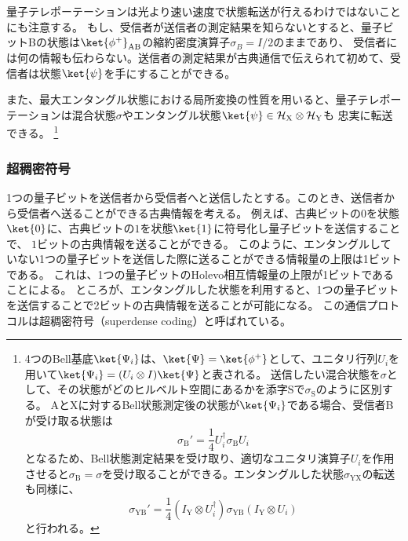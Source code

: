 \documentclass[a4paper,11pt,uplatex]{jsarticle}%
\begin{document}
量子テレポーテーションは光より速い速度で状態転送が行えるわけではないことにも注意する。
もし、受信者が送信者の測定結果を知らないとすると、量子ビットBの状態は$\ket{\phi^{+}}_{\text{AB}}$の縮約密度演算子$\sigma_{B} = I/2$のままであり、
受信者には何の情報も伝わらない。送信者の測定結果が古典通信で伝えられて初めて、受信者は状態$\ket{\psi}$を手にすることができる。

また、最大エンタングル状態における局所変換の性質を用いると、量子テレポーテーションは混合状態$\sigma$やエンタングル状態$\ket{\psi}\in\mathcal{H}_{\text{X}}\otimes\mathcal{H}_{\text{Y}}$も
忠実に転送できる。
\footnote{
4つのBell基底$\ket{\Psi_i}$は、$\ket{\Psi} = \ket{\phi^+}$として、ユニタリ行列$U_i$を用いて$\ket{\Psi_i} = (U_i\otimes I)\ket{\Psi}$と表される。
送信したい混合状態を$\sigma$として、その状態がどのヒルベルト空間にあるかを添字$\text{S}$で$\sigma_{\text{S}}$のように区別する。
AとXに対するBell状態測定後の状態が$\ket{\Psi_i}$である場合、受信者Bが受け取る状態は
\begin{equation}
  \sigma_\text{B}' = \frac{1}{4}U^{\dagger}_i \sigma_\text{B}U_i
\end{equation}
となるため、Bell状態測定結果を受け取り、適切なユニタリ演算子$U_i$を作用させると$\sigma_{\text{B}} = \sigma$を受け取ることができる。エンタングルした状態$\sigma_{\text{YX}}$の転送も同様に、
\begin{equation}
  \sigma_{\text{YB}}' = \frac{1}{4}(I_{\text{Y}}\otimes U^{\dagger}_i) \sigma_{\text{YB}}(I_{\text{Y}}\otimes U_i)
\end{equation}
と行われる。
}
\newpage

\subsubsection{超稠密符号}
1つの量子ビットを送信者から受信者へと送信したとする。このとき、送信者から受信者へ送ることができる古典情報を考える。
例えば、古典ビットの$0$を状態$\ket{0}$に、古典ビットの$1$を状態$\ket{1}$に符号化し量子ビットを送信することで、
$1$ビットの古典情報を送ることができる。
このように、エンタングルしていない1つの量子ビットを送信した際に送ることができる情報量の上限は1ビットである。
これは、1つの量子ビットのHolevo相互情報量の上限が1ビットであることによる。\cite{1}
ところが、エンタングルした状態を利用すると、1つの量子ビットを送信することで2ビットの古典情報を送ることが可能になる。
この通信プロトコルは超稠密符号（superdense coding）と呼ばれている。
\end{document}
